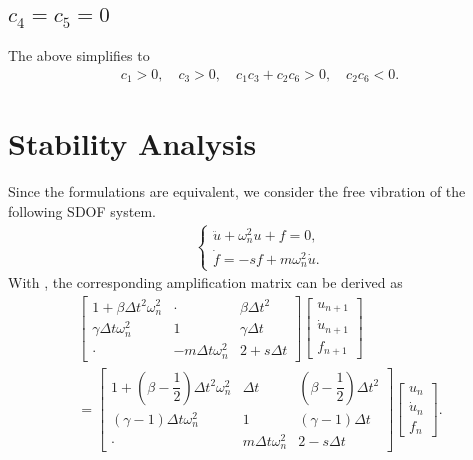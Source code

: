 \subsection{$c_4=c_5=0$}
The above simplifies to
\begin{gather}
    \boxed{
    c_1>0,\quad
    c_3>0,\quad
    c_1c_3+c_2c_6>0,\quad
    c_2c_6<0.}
\end{gather}
\section{Stability Analysis}
Since the formulations are equivalent, we consider the free vibration of the following SDOF system.
\begin{gather}
    \left\{\begin{array}{l}
        \ddot{u}+\omega_n^2u+f=0, \\
        \dot{f}=-sf+m\omega^2_n\dot{u}.
    \end{array}\right.
\end{gather}
With , the corresponding amplification matrix can be derived as
\begin{multline}
\begin{bmatrix}
1+\beta\Delta{}t^2\omega^2_n&\cdot&\beta\Delta{}t^2\\
\gamma\Delta{}t\omega^2_n&1&\gamma\Delta{}t\\
\cdot&-m\Delta{}t\omega^2_n&2+s\Delta{}t
\end{bmatrix}\begin{bmatrix}
u_{n+1}\\\dot{u}_{n+1}\\f_{n+1}
\end{bmatrix}\\=\begin{bmatrix}
1+\left(\beta-\dfrac{1}{2}\right)\Delta{}t^2\omega_n^2&\Delta{}t&\left(\beta-\dfrac{1}{2}\right)\Delta{}t^2\\
\left(\gamma-1\right)\Delta{}t\omega_n^2&1&\left(\gamma-1\right)\Delta{}t\\
\cdot&m\Delta{}t\omega^2_n&2-s\Delta{}t
\end{bmatrix}
\begin{bmatrix}
u_n\\\dot{u}_n\\f_n
\end{bmatrix}.
\end{multline}